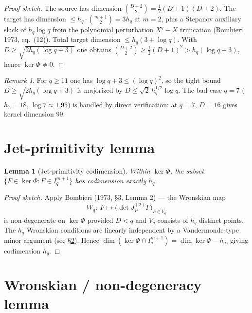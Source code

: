 \documentclass[12pt]{amsart}
\newtheorem{lemma}{Lemma}
\theoremstyle{definition}
\theoremstyle{remark}
\newtheorem{remark}{Remark}
\begin{document}
\begin{proof}[Proof sketch]
The source has dimension
$\binom{D+2}{2} = \tfrac{1}{2}(D+1)(D+2)$.
The target has dimension $\le h_q \cdot \binom{m+1}{2} = 3 h_q$ at $m = 2$,
plus a Stepanov auxiliary slack of $h_q \log q$ from the polynomial
perturbation $X^q - X$ truncation (Bombieri 1973, eq.\ (12)).
Total target dimension $\le h_q (3 + \log q)$.
With $D \ge \sqrt{2 h_q (\log q + 3)}$ one obtains
$\binom{D+2}{2} \ge \tfrac{1}{2}(D+1)^2 > h_q(\log q + 3)$,
hence $\ker \Phi \ne 0$.
\qedhere
\end{proof}

\begin{remark}
For $q \ge 11$ one has $\log q + 3 \le (\log q)^2$, so the tight
bound $D \ge \sqrt{2 h_q (\log q + 3)}$ is majorized by
$D \le \sqrt{2}\, h_q^{1/2} \log q$. The bad case $q = 7$ ($h_7 = 18$,
$\log 7 \approx 1.95$) is handled by direct verification: at $q=7$, $D = 16$ gives kernel dimension $99$.
\end{remark}

\section{Jet-primitivity lemma}

\begin{lemma}[Jet-primitivity codimension]\label{lem:primitive}
Within $\ker\Phi$, the subset
$\{F \in \ker\Phi : F \in I_q^{m+1}\}$
has codimension exactly $h_q$.
\end{lemma}

\begin{proof}[Proof sketch]
Apply Bombieri (1973, \S3, Lemma 2) --- the Wronskian map
$$
W_q :\ F \mapsto \bigl(\det J^{(2)}_P F\bigr)_{P \in V_q}
$$
is non-degenerate on $\ker\Phi$ provided $D < q$ and $V_q$ consists of
$h_q$ distinct points. The $h_q$ Wronskian conditions are linearly
independent by a Vandermonde-type minor argument (see \S\ref{sec:wronskian}).
Hence $\dim(\ker\Phi \cap I_q^{m+1}) = \dim\ker\Phi - h_q$, giving
codimension $h_q$.
\qedhere
\end{proof}

\section{Wronskian / non-degeneracy lemma}
\label{sec:wronskian}
\end{document}
